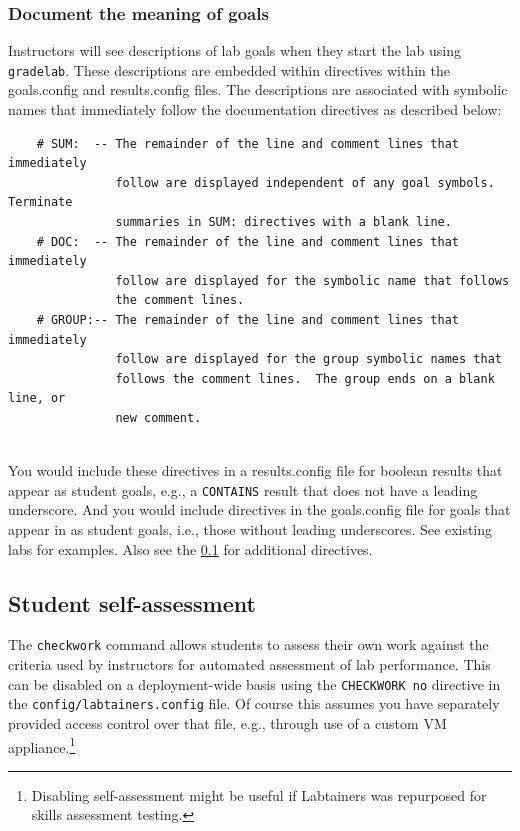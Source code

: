 \documentclass[12pt]{article}
\begin{document}
\subsubsection{Document the meaning of goals}
\label{document goals}
Instructors will see descriptions of lab goals when they start the lab using {\tt gradelab}.
These descriptions are embedded within directives within the goals.config and results.config files.
The descriptions are associated with symbolic names that immediately follow the documentation
directives as described below:
\begin{verbatim}
    # SUM:  -- The remainder of the line and comment lines that immediately
               follow are displayed independent of any goal symbols. Terminate
               summaries in SUM: directives with a blank line.
    # DOC:  -- The remainder of the line and comment lines that immediately 
               follow are displayed for the symbolic name that follows
               the comment lines.
    # GROUP:-- The remainder of the line and comment lines that immediately 
               follow are displayed for the group symbolic names that 
               follows the comment lines.  The group ends on a blank line, or 
               new comment.
   
\end{verbatim} 
\noindent You would include these directives in a results.config file for boolean results that appear as student goals,
e.g., a {\tt CONTAINS} result that does not have a leading underscore. And you would include directives in the goals.config
file for goals that appear in as student goals, i.e., those without leading underscores.  
See existing labs for examples.  Also see the \ref{checkwork} for additional directives.

\subsection {Student self-assessment}
\label{checkwork}
The {\tt checkwork} command allows students to assess their own work against
the criteria used by instructors for automated assessment of lab performance.
This can be disabled on a deployment-wide basis using the {\tt CHECKWORK no} directive
in the {\tt config/labtainers.config} file.  Of course this assumes you have separately
provided access control over that file, e.g., through use of a custom VM appliance.\footnote{
Disabling self-assessment might be useful if Labtainers was repurposed for skills assessment
testing.}
\end{document}
